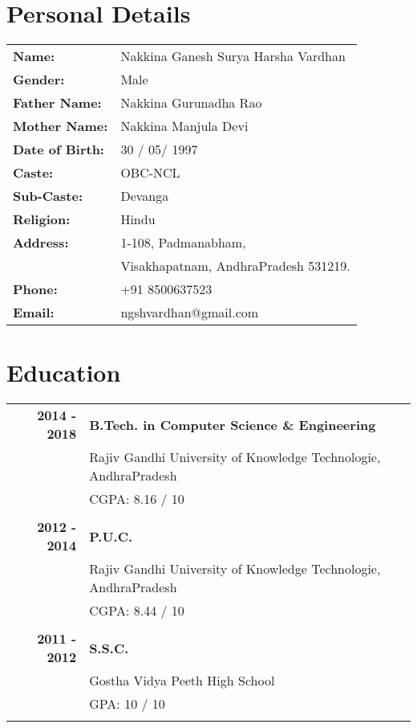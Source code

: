 \documentclass[a4paper,12pt]{article}
\begin{document}
\pagestyle{empty}

\section{Personal Details}

\begin{tabular}{l l}

	\textbf{Name: } & Nakkina Ganesh Surya Harsha Vardhan \\[5pt]
	\textbf{Gender: } & Male \\[5pt]
	\textbf{Father Name: } & Nakkina Gurunadha Rao \\[5pt]
	\textbf{Mother Name: } & Nakkina Manjula Devi \\[5pt]
	\textbf{Date of Birth: } & 30 / 05/ 1997 \\[5pt]
	\textbf{Caste: } & OBC-NCL \\[5pt]
	\textbf{Sub-Caste: } & Devanga \\[5pt]
	\textbf{Religion: } & Hindu \\[5pt]
	\textbf{Address: } & 1-108, Padmanabham, \\[5pt]
		& Visakhapatnam, AndhraPradesh 531219.\\[5pt]
	\textbf{Phone: } & +91 8500637523 \\[5pt]
	\textbf{Email: } & ngshvardhan@gmail.com \\[5pt]
	
\end{tabular}

\par\vspace{\parskip}

\section{Education}
\begin{tabular}{rl}

\textbf{2014 - 2018} & \textbf{B.Tech. in Computer Science \& Engineering}\\
& Rajiv Gandhi University of Knowledge Technologie, AndhraPradesh\\
& \textsc{CGPA: } 8.16 / 10\\&\\

\textbf{2012 - 2014} & \textbf{P.U.C.} \\
& Rajiv Gandhi University of Knowledge Technologie, AndhraPradesh\\
& \textsc{CGPA: } 8.44 / 10\\&\\

\textbf{2011 - 2012} & \textbf{S.S.C.}\\
& Gostha Vidya Peeth High School\\
& \textsc{GPA: } 10 / 10\\&\\

\end{tabular}
\end{document}
